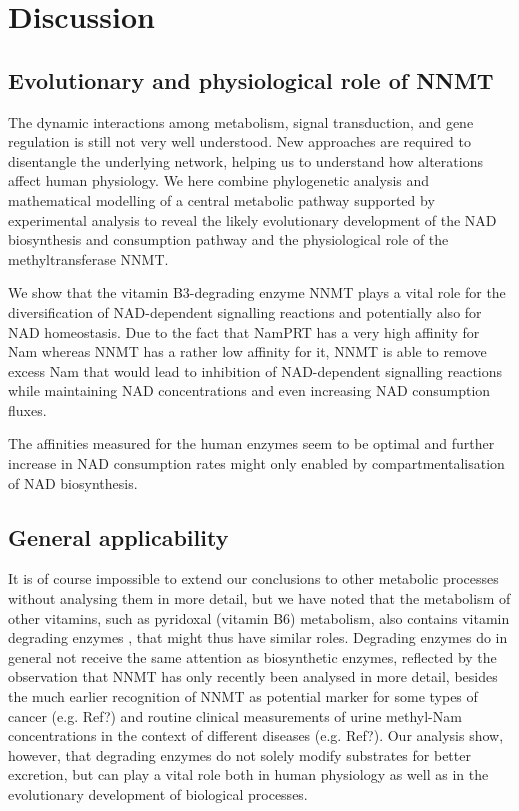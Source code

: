 
\section{Discussion}

\subsection{Evolutionary and physiological role of NNMT}

The dynamic interactions among metabolism, signal transduction, and gene regulation is still not very well understood. New approaches are required to disentangle the underlying network, helping us to understand how alterations affect human physiology. We here combine phylogenetic analysis and mathematical modelling of a central metabolic pathway supported by experimental analysis to reveal the likely evolutionary development of the NAD biosynthesis and consumption pathway and the physiological role of the methyltransferase NNMT.

We show that the vitamin B3-degrading enzyme NNMT plays a vital role for the diversification of NAD-dependent signalling reactions and potentially also for NAD homeostasis. Due to the fact that NamPRT has a very high affinity for Nam whereas NNMT has a rather low affinity for it, NNMT is able to remove excess Nam that would lead to inhibition of NAD-dependent signalling reactions while maintaining NAD concentrations and even increasing NAD consumption fluxes.

The affinities measured for the human enzymes seem to be optimal and further increase in NAD consumption rates might only enabled by compartmentalisation of NAD biosynthesis.


\subsection{General applicability}

It is of course impossible to extend our conclusions to other metabolic processes without analysing them in more detail, but we have noted that the metabolism of other vitamins, such as pyridoxal (vitamin B6) metabolism, also contains vitamin degrading enzymes , that might thus have similar roles. Degrading enzymes do in general not receive the same attention as biosynthetic enzymes, reflected by the observation that NNMT has only recently been analysed in more detail, besides the much earlier recognition of NNMT as potential marker for some types of cancer (e.g. Ref?) and routine clinical measurements of urine methyl-Nam concentrations in the context of different diseases (e.g. Ref?). Our analysis show, however, that degrading enzymes do not solely modify substrates for better excretion, but can play a vital role both in human physiology as well as in the evolutionary development of biological processes.


